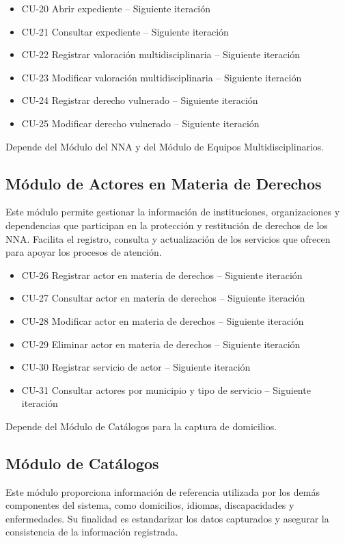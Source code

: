 \begin{itemize}
	\item CU-20 Abrir expediente -- Siguiente iteración
	\item CU-21 Consultar expediente -- Siguiente iteración
	\item CU-22 Registrar valoración multidisciplinaria -- Siguiente iteración
	\item CU-23 Modificar valoración multidisciplinaria -- Siguiente iteración
	\item CU-24 Registrar derecho vulnerado -- Siguiente iteración
	\item CU-25 Modificar derecho vulnerado -- Siguiente iteración
\end{itemize}
Depende del Módulo del NNA y del Módulo de Equipos Multidisciplinarios.

\subsection*{Módulo de Actores en Materia de Derechos}
Este módulo permite gestionar la información de instituciones, organizaciones y dependencias que participan en la protección y restitución de derechos de los NNA. Facilita el registro, consulta y actualización de los servicios que ofrecen para apoyar los procesos de atención.

\begin{itemize}
	\item CU-26 Registrar actor en materia de derechos -- Siguiente iteración
	\item CU-27 Consultar actor en materia de derechos -- Siguiente iteración
	\item CU-28 Modificar actor en materia de derechos -- Siguiente iteración
	\item CU-29 Eliminar actor en materia de derechos -- Siguiente iteración
	\item CU-30 Registrar servicio de actor -- Siguiente iteración
	\item CU-31 Consultar actores por municipio y tipo de servicio -- Siguiente iteración
\end{itemize}
Depende del Módulo de Catálogos para la captura de domicilios.

\subsection*{Módulo de Catálogos}

Este módulo proporciona información de referencia utilizada por los demás componentes del sistema, como domicilios, idiomas, discapacidades y enfermedades. Su finalidad es estandarizar los datos capturados y asegurar la consistencia de la información registrada.

